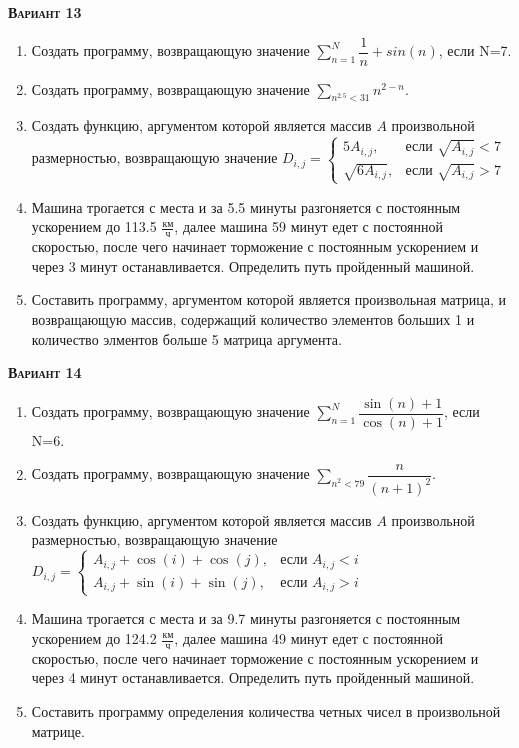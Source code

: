 \textsc{\textbf{Вариант 13}}
\begin{enumerate}
\item  Создать программу, возвращающую значение $\sum\limits_{n=1}^{N} {\dfrac{1}{n} +sin(n)}        $, если N=7. 
\item  Создать программу, возвращающую значение $\sum\limits_{n^{2.5}<  31} n^{2-n}                       $. 
\item Создать функцию, аргументом которой является массив $A$ произвольной размерностью, возвращающую значение $D_{i,j}=\begin{cases} 5 A_{i,j}, & \text{если } \sqrt{A_{i,j}}<7 \\ \sqrt{ 6 A_{i,j}}, & \text{если } \sqrt{A_{i,j}}>7 \end{cases}           $ 
\item Машина трогается с места и за  5.5 минуты разгоняется с постоянным ускорением до 113.5 ${\frac{км}{ч}}$, далее машина   59 минут едет с постоянной скоростью, после чего начинает торможение с постоянным ускорением и через   3 минут останавливается. Определить путь пройденный машиной.  \item Составить программу, аргументом которой является произвольная матрица, и возвращающую массив, содержащий количество элементов больших 1 и количество элментов больше 5 матрица аргумента.

\end{enumerate}
\textsc{\textbf{Вариант 14}}
\begin{enumerate}
\item  Создать программу, возвращающую значение $\sum\limits_{n=1}^{N} \dfrac{\sin(n)+1}{\cos(n)+1}  $, если N=6. 
\item  Создать программу, возвращающую значение $\sum\limits_{n^2<      79} \dfrac{n}{(n+1)^2}            $. 
\item Создать функцию, аргументом которой является массив $A$ произвольной размерностью, возвращающую значение $D_{i,j}=\begin{cases} A_{i,j}+\cos(i)+\cos(j), & \text{если } {A_{i,j}}<i \\  A_{i,j}+\sin(i)+\sin(j), & \text{если } {A_{i,j}}>i \end{cases}$ 
\item Машина трогается с места и за  9.7 минуты разгоняется с постоянным ускорением до 124.2 ${\frac{км}{ч}}$, далее машина   49 минут едет с постоянной скоростью, после чего начинает торможение с постоянным ускорением и через   4 минут останавливается. Определить путь пройденный машиной.  \item Составить программу определения количества четных чисел в произвольной матрице.                                                                                                                                                                                                  

\end{enumerate}
